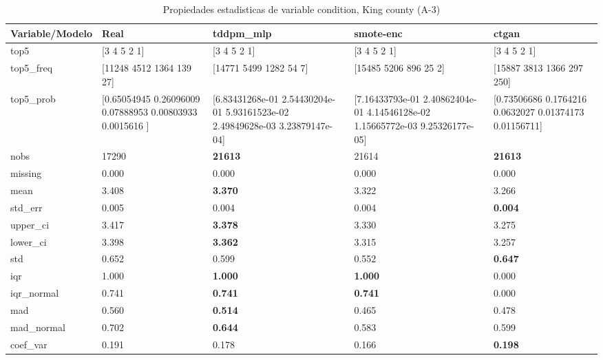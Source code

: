 \begin{table}[H]
\centering
\fontsize{8}{14}\selectfont
\caption{Propiedades  estadisticas de variable condition, King county (A-3)}
\label{table-stats-king county-a-3-condition}
\begin{tabular}{|l|m{10em}|m{10em}|m{10em}|m{10em}|}
\hline
 \rowcolor[gray]{0.8}
Variable/Modelo & Real & tddpm\_mlp & smote-enc & ctgan \\
\hline top5 & [3 4 5 2 1] & [3 4 5 2 1] & [3 4 5 2 1] & [3 4 5 2 1] \\
\hline top5\_freq & [11248  4512  1364   139    27] & [14771  5499  1282    54     7] & [15485  5206   896    25     2] & [15887  3813  1366   297   250] \\
\hline top5\_prob & [0.65054945 0.26096009 0.07888953 0.00803933 0.0015616 ] & [6.83431268e-01 2.54430204e-01 5.93161523e-02 2.49849628e-03
 3.23879147e-04] & [7.16433793e-01 2.40862404e-01 4.14546128e-02 1.15665772e-03
 9.25326177e-05] & [0.73506686 0.1764216  0.0632027  0.01374173 0.01156711] \\
\hline nobs & 17290 & \bfseries 21613 & \cellcolor[rgb]{0.9, 0.54, 0.52} 21614 & \bfseries 21613 \\
\hline missing & 0.000 & 0.000 & 0.000 & 0.000 \\
\hline mean & 3.408 & \bfseries 3.370 & 3.322 & \cellcolor[rgb]{0.9, 0.54, 0.52} 3.266 \\
\hline std\_err & 0.005 & 0.004 & \cellcolor[rgb]{0.9, 0.54, 0.52} 0.004 & \bfseries 0.004 \\
\hline upper\_ci & 3.417 & \bfseries 3.378 & 3.330 & \cellcolor[rgb]{0.9, 0.54, 0.52} 3.275 \\
\hline lower\_ci & 3.398 & \bfseries 3.362 & 3.315 & \cellcolor[rgb]{0.9, 0.54, 0.52} 3.257 \\
\hline std & 0.652 & 0.599 & \cellcolor[rgb]{0.9, 0.54, 0.52} 0.552 & \bfseries 0.647 \\
\hline iqr & 1.000 & \bfseries 1.000 & \bfseries 1.000 & \cellcolor[rgb]{0.9, 0.54, 0.52} 0.000 \\
\hline iqr\_normal & 0.741 & \bfseries 0.741 & \bfseries 0.741 & \cellcolor[rgb]{0.9, 0.54, 0.52} 0.000 \\
\hline mad & 0.560 & \bfseries 0.514 & \cellcolor[rgb]{0.9, 0.54, 0.52} 0.465 & 0.478 \\
\hline mad\_normal & 0.702 & \bfseries 0.644 & \cellcolor[rgb]{0.9, 0.54, 0.52} 0.583 & 0.599 \\
\hline coef\_var & 0.191 & 0.178 & \cellcolor[rgb]{0.9, 0.54, 0.52} 0.166 & \bfseries 0.198 \\

\end{tabular}
\end{table}
